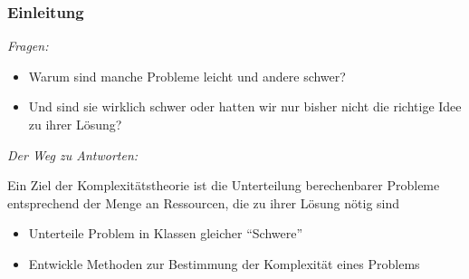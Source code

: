 \documentclass[aspectratio=1610,onlymath]{beamer}
\begin{document}
\begin{frame}\frametitle{Einleitung}

\emph{Fragen:}
\begin{itemize}
\item Warum sind manche Probleme leicht und andere schwer?
\item Und sind sie wirklich schwer oder hatten wir nur bisher nicht die richtige Idee zu ihrer Lösung?
\end{itemize}\bigskip

\emph{Der Weg zu Antworten:}\smallskip

Ein Ziel der \alert{Komplexitätstheorie} ist die Unterteilung berechenbarer Probleme
entsprechend der Menge an Ressourcen, die zu ihrer Lösung nötig sind
\begin{itemize}
\item Unterteile Problem in Klassen gleicher "`Schwere"'
\item Entwickle Methoden zur Bestimmung der Komplexität eines Problems
\end{itemize}

\end{frame}

\end{document}
